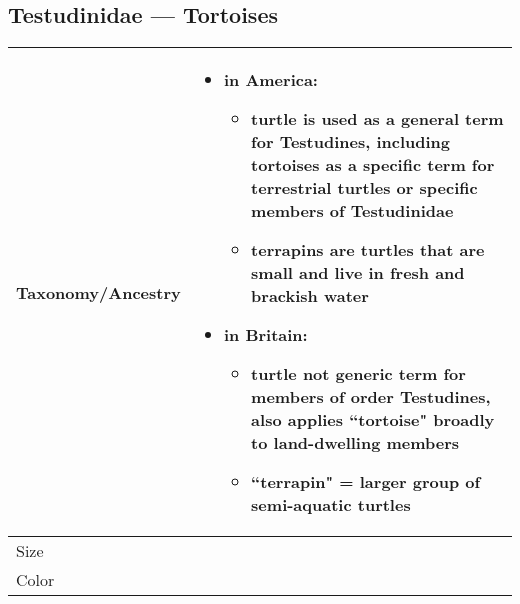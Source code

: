 \subsection{Testudinidae --- Tortoises}
\begin{center}
\begin{longtabu} to 

	\hline
	Taxonomy/Ancestry &
	\begin{itemize}[noitemsep]
		\item in America:
			\begin{itemize}[noitemsep]
				\item turtle is used as a general term for Testudines, including tortoises as a specific term for terrestrial turtles or specific members of Testudinidae
				\item terrapins are turtles that are small and live in fresh and brackish water
			\end{itemize}
		\item in Britain:
			\begin{itemize}[noitemsep]
				\item turtle not generic term for members of order Testudines, also applies ``tortoise" broadly to land-dwelling members
				\item ``terrapin" = larger group of semi-aquatic turtles
			\end{itemize}	
	\end{itemize}
	
	 \\
	\hline
	Size & 
	
	\\
	\hline
	Color &
	

\end{longtabu}
\end{center}
